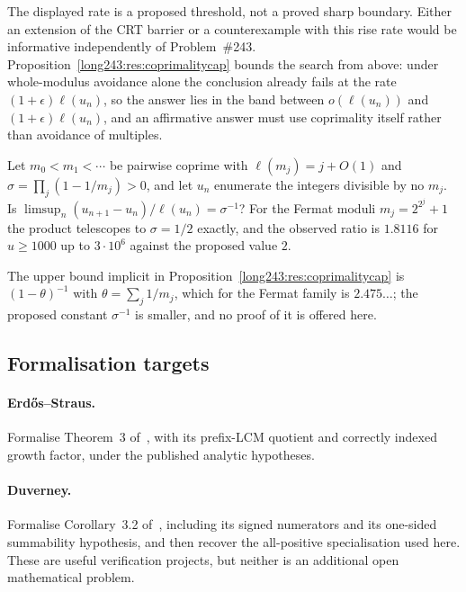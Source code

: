 \documentclass[11pt]{article}
\begin{document}
\noindent The displayed rate is a proposed threshold, not a proved sharp
boundary.  Either an extension of the CRT barrier or a counterexample with
this rise rate would be informative independently of Problem~\#243.
Proposition~\ref{long243:res:coprimalitycap} bounds the search from above: under
whole-modulus avoidance alone the conclusion already fails at the rate
$(1+\epsilon)\ell(u_n)$, so the answer lies in the band between
$o(\ell(u_n))$ and $(1+\epsilon)\ell(u_n)$, and an affirmative answer must use
coprimality itself rather than avoidance of multiples.

\begin{problem}\label{long243:res:gapconstant}
Let $m_0<m_1<\cdots$ be pairwise coprime with $\ell(m_j)=j+O(1)$ and
$\sigma=\prod_j(1-1/m_j)>0$, and let $u_n$ enumerate the integers divisible by
no $m_j$.  Is $\limsup_n(u_{n+1}-u_n)/\ell(u_n)=\sigma^{-1}$?  For the Fermat
moduli $m_j=2^{2^j}+1$ the product telescopes to $\sigma=1/2$ exactly, and the
observed ratio is $1.8116$ for $u\ge1000$ up to $3\cdot10^6$ against the
proposed value $2$.
\end{problem}

\noindent The upper bound implicit in Proposition~\ref{long243:res:coprimalitycap} is
$(1-\theta)^{-1}$ with $\theta=\sum_j1/m_j$, which for the Fermat family is
$2.475\ldots$; the proposed constant $\sigma^{-1}$ is smaller, and no proof of
it is offered here.

\subsection*{Formalisation targets}

\paragraph{Erd\H{o}s--Straus.}
Formalise Theorem~3 of~\cite{erdosstraus1964}, with its prefix-LCM quotient
and correctly indexed growth factor, under the published analytic hypotheses.

\paragraph{Duverney.}
Formalise Corollary~3.2 of~\cite{duverney2001}, including its signed
numerators and its one-sided summability hypothesis, and then recover the
all-positive specialisation used here.  These are useful verification
projects, but neither is an additional open mathematical problem.
\end{document}
